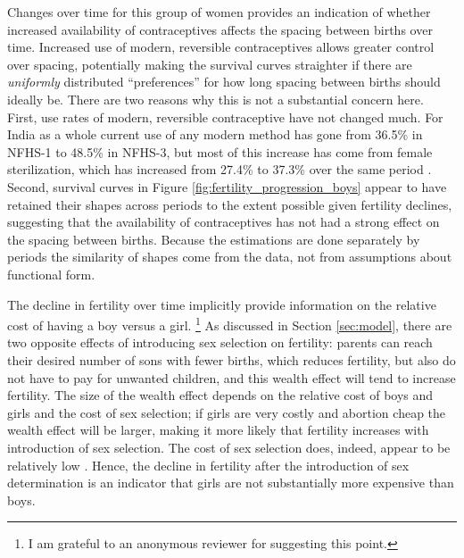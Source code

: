 \documentclass[12pt,letterpaper]{article}
\begin{document}
Changes over time for this group of women provides an indication of whether increased 
availability of contraceptives affects the spacing between births over time.
Increased use of modern, reversible contraceptives allows greater control over spacing, 
potentially making the survival curves straighter if there are \emph{uniformly} distributed
``preferences'' for how long spacing between births should ideally be.
There are two reasons why this is not a substantial concern here.
First, use rates of modern, reversible contraceptive have not changed much.
For India as a whole current use of any modern method has gone from 36.5\% in NFHS-1 to 
48.5\% in NFHS-3, but most of this increase has come from female sterilization, which has 
increased from 27.4\% to 37.3\% over the same period 
\citep[p.\ 127]{International-Institute-for-Population-Sciences-IIPS2007}.
Second, survival curves in Figure \ref{fig:fertility_progression_boys} appear to have 
retained their shapes across periods to the extent possible given fertility declines, 
suggesting that the availability of contraceptives has not had a strong effect on the 
spacing between births.
Because the estimations are done separately by periods the similarity of shapes come from 
the data, not from assumptions about functional form.


The decline in fertility over time implicitly provide information on the relative
cost of having a boy versus a girl.%
\footnote{
I am grateful to an anonymous reviewer for suggesting this point.
}
As discussed in Section \ref{sec:model}, there are two opposite effects of introducing
sex selection on fertility: parents can reach their desired number of sons with fewer 
births, which reduces fertility, but also do not have to pay for unwanted children,
and this wealth effect will tend to increase fertility.
The size of the wealth effect depends on the relative cost of boys and girls and the cost 
of sex selection; if girls are very costly and abortion cheap the wealth effect will be
larger, making it more likely that fertility increases with introduction of 
sex selection.
The cost of sex selection does, indeed, appear to be relatively low 
\citep[see, for example][]{Khanna1997}.
Hence, the decline in fertility after the introduction of sex determination is an 
indicator that girls are not substantially more expensive than boys.
\end{document}
